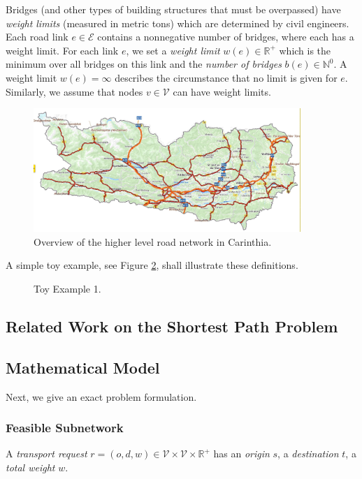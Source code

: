 Bridges (and other types of building structures that must be overpassed)
have \emph{weight limits} (measured in metric tons) which are determined by civil engineers.
Each road link $e \in \mathcal{E}$ contains a nonnegative number of bridges, where each has a weight limit.
For each link $e$, we set a \emph{weight limit} $w(e) \in \mathbb{R}^{+}$ which is the
minimum over all bridges on this link and the \emph{number of bridges} $b(e) \in \mathbb{N}^{0}$.
A weight limit $w(e)= \infty$ describes the circumstance
that no limit is given for $e$.
Similarly, we assume that nodes $v \in \mathcal{V}$ can have weight limits.
\begin{figure}[!ht]
  \centering
  \includegraphics[width=0.9\textwidth]{map.jpg}
  \caption{Overview of the higher level road network in Carinthia.}
  \label{fig:higher level}
\end{figure}


A simple toy example, see Figure \ref{fig_toy_example_1}, shall illustrate these definitions.
\begin{figure}[!ht]
  \centering
  
  \caption{Toy Example 1.}
  \label{fig_toy_example_1}
\end{figure}


\subsection{Related Work on the Shortest Path Problem}

\citet{TACCARI2016122}

\subsection{Mathematical Model}

Next, we give an exact problem formulation.

\subsubsection{Feasible Subnetwork}
A \emph{transport request} $r=(o,d,w) \in \mathcal{V} \times \mathcal{V} \times \mathbb{R}^{+}$
has an \emph{origin} $s$, a \emph{destination} $t$, a \emph{total weight} $w$.

